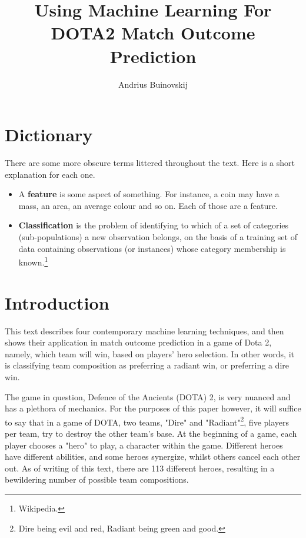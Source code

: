 \documentclass[a4paper, 12pt]{article}
\begin{document}
\title{Using Machine Learning For DOTA2 Match Outcome Prediction}
\author{Andrius Buinovskij}
\maketitle

    \section{Dictionary}

	\par There are some more obscure terms littered throughout the text. Here is a short explanation for each one.

        \begin{itemize}
            \item A \textbf{feature} is some aspect of something. For instance, a coin may have a mass, an area, an average colour and so on. Each of those are a feature.
            \item \textbf{Classification} is the problem of identifying to which of a set of categories (sub-populations) a new observation belongs, on the basis of a training set of data containing observations (or instances) whose category membership is known.\footnote{Wikipedia.}

        \end{itemize}

    \section{Introduction}

        \par This text describes four contemporary machine learning techniques, and then shows their application in match outcome prediction in a game of Dota 2, namely, which team will win, based on players' hero selection. In other words, it is classifying team composition as preferring a radiant win, or preferring a dire win.

        \par The game in question, Defence of the Ancients (DOTA) 2, is very nuanced and has a plethora of mechanics. For the purposes of this paper however, it will suffice to say that in a game of DOTA, two teams, "Dire" and "Radiant"\footnote{Dire being evil and red, Radiant being green and good.}, five players per team, try to destroy the other team's base. At the beginning of a game, each player chooses a "hero" to play, a character within the game. Different heroes have different abilities, and some heroes synergize, whilst others cancel each other out. As of writing of this text, there are 113 different heroes, resulting in a bewildering number of possible team compositions.
        
\end{document}
